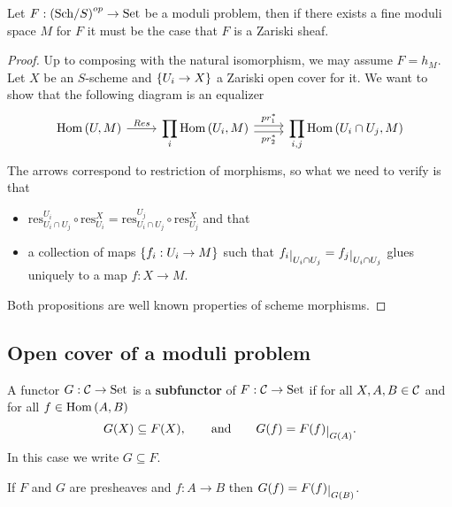 \begin{proposition}\label{RepresentableModuliFunctorsAreZariskiSheaves}
Let $F:\left({\mathrm{Sch}}/{S}\right)^{op}\to \mathrm{Set}$ be a moduli problem, then if there exists a fine moduli space $M$ for $F$ it must be the case that $F$ is a Zariski sheaf.
\end{proposition}
\begin{proof}
Up to composing with the natural isomorphism, we may assume $F=h_M$. 
Let $X$ be an $S$-scheme and $\left\{{U_i\to X}\right\}$ a Zariski open cover for it. 
We want to show that the following diagram is an equalizer
\[\begin{tikzcd}
	{\Hom(U,M)} & {\displaystyle \prod_i \Hom(U_i,M)} & {\displaystyle \prod_{i,j}\Hom(U_i\cap U_j,M)}
	\arrow["Res", from=1-1, to=1-2]
	\arrow["{pr_1^\ast}", shift left, from=1-2, to=1-3]
	\arrow["{pr_2^\ast}"', shift right, from=1-2, to=1-3]
\end{tikzcd}\]
The arrows correspond to restriction of morphisms, so what we need to verify is that
\begin{itemize}
\item $\mathrm{res}^{U_i}_{U_i\cap U_j}\circ \mathrm{res}^X_{U_i}=\mathrm{res}^{U_j}_{U_i\cap U_j}\circ \mathrm{res}^X_{U_j}$ and that
\item a collection of maps $\left\{{f_i:U_i\to M}\right\}$ such that $f_i\res{U_i\cap U_j}=f_j\res{U_i\cap U_j}$ glues uniquely to a map $f:X\to M$.
\end{itemize}
Both propositions are well known properties of scheme morphisms.
\end{proof}

\subsection{Open cover of a moduli problem}
\begin{definition}[Subfunctor]
A functor $G:\mathcal{C}\to \mathrm{Set}$ is a \textbf{subfunctor} of $F:\mathcal{C}\to \mathrm{Set}$ if for all $X,A,B\in \mathcal{C}$ and for all $f\in \mathrm{Hom}\,(A,B)$
\[G(X)\subseteq F(X),\qquad\text{and}\qquad G(f)=F(f)\res{G(A)}.\]
In this case we write $G\subseteq F$.
\end{definition}
\begin{remark}
If $F$ and $G$ are presheaves and $f:A\to B$ then $G(f)=F(f)\res{G(B)}$.
\end{remark}

